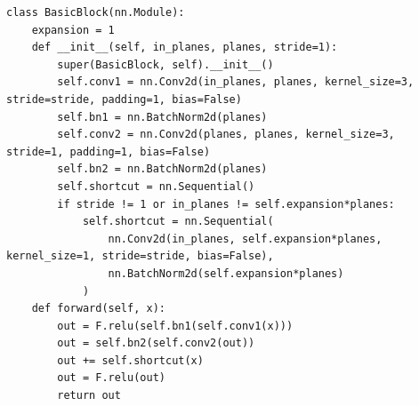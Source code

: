 \begin{lstlisting}[caption={Kode ResNet-18 28x28}, label={code:4.kode_resnet18_28}]
class BasicBlock(nn.Module):
    expansion = 1
    def __init__(self, in_planes, planes, stride=1):
        super(BasicBlock, self).__init__()
        self.conv1 = nn.Conv2d(in_planes, planes, kernel_size=3, stride=stride, padding=1, bias=False)
        self.bn1 = nn.BatchNorm2d(planes)
        self.conv2 = nn.Conv2d(planes, planes, kernel_size=3, stride=1, padding=1, bias=False)
        self.bn2 = nn.BatchNorm2d(planes)
        self.shortcut = nn.Sequential()
        if stride != 1 or in_planes != self.expansion*planes:
            self.shortcut = nn.Sequential(
                nn.Conv2d(in_planes, self.expansion*planes, kernel_size=1, stride=stride, bias=False),
                nn.BatchNorm2d(self.expansion*planes)
            )
    def forward(self, x):
        out = F.relu(self.bn1(self.conv1(x)))
        out = self.bn2(self.conv2(out))
        out += self.shortcut(x)
        out = F.relu(out)
        return out
\end{lstlisting}


